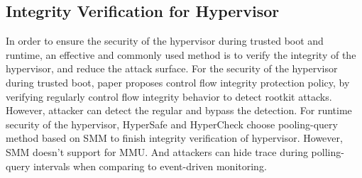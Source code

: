 \documentclass[conference]{IEEEtran}
\begin{document}
\subsection{Integrity Verification for Hypervisor}
In order to ensure the security of the hypervisor during trusted boot and runtime, an effective and commonly used method is to verify the integrity of the hypervisor, and reduce the attack surface. For the security of the hypervisor during trusted boot, paper \cite{Petroni2007Automated} proposes control flow integrity protection policy, by verifying regularly control flow integrity behavior to detect rootkit attacks. However, attacker can detect the regular and bypass the detection. For runtime security of the hypervisor, HyperSafe \cite{Wang2010HyperSafe} and HyperCheck \cite{Wang2010HyperCheck} choose pooling-query method based on SMM to finish integrity verification of hypervisor. However, SMM doesn't support for MMU. And attackers can hide trace during polling-query intervals when comparing to event-driven monitoring.
\fi


\end{document}
